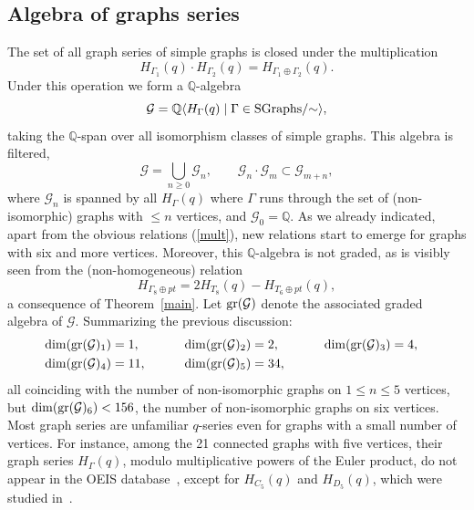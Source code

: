 \documentclass[pdftex]{sigma}
\numberwithin{equation}{section}
\theoremstyle{definition}
\begin{document}
\subsection{Algebra of graphs series}\label{section2.5}
The set of all graph series of simple graphs is closed under the multiplication
\begin{equation} \label{mult}
H_{\Gamma_1}(q) \cdot H_{\Gamma_2}(q)=H_{\Gamma_1 \oplus \Gamma_2}(q).
\end{equation}
Under this operation we form a $\mathbb{Q}$-algebra
\[
\mathcal{G}=\mathbb{Q} \langle H_{\Gamma}(q) \mid \Gamma \in {\rm SGraphs}/{\sim} \rangle,
\]
taking the $\mathbb{Q}$-span over all isomorphism classes of simple graphs.
This algebra is filtered,
\[
\mathcal{G}=\bigcup_{n \geq 0} \mathcal{G}_n, \qquad \mathcal{G}_n \cdot \mathcal{G}_m \subset \mathcal{G}_{m+n},
\]
where $\mathcal{G}_n$ is spanned by all $H_{\Gamma}(q)$ where $\Gamma$ runs through the set of (non-isomorphic)
graphs with $\leq n$ vertices, and $\mathcal{G}_0=\mathbb{Q}$.
As we already indicated, apart from the obvious relations (\ref{mult}), new relations start to emerge for graphs with six and more vertices.
Moreover, this $\mathbb{Q}$-algebra is not graded, as is visibly seen from the (non-homogeneous) relation
\[
H_{\Gamma_8 \oplus pt}=2 H_{T_8}(q)-H_{T_6 \oplus pt}(q),
\]
a consequence of Theorem~\ref{main}. Let ${\rm gr}(\mathcal{G})$ denote the associated graded algebra of $\mathcal{G}$.
Summarizing the previous discussion:
\begin{alignat*}{4}
& \dim ({\rm gr}(\mathcal{G})_1)=1, \qquad&& \dim ({\rm gr}(\mathcal{G})_2)=2, \qquad && \dim ({\rm gr}(\mathcal{G})_3)=4,&\\
& \dim ({\rm gr}(\mathcal{G})_4)=11,\qquad&& \dim ({\rm gr}(\mathcal{G})_5)=34, \qquad && &
\end{alignat*}
all coinciding with the number of non-isomorphic graphs on $1 \!\leq\! n\! \leq\! 5$ vertices, but $\dim ({\rm gr}(\mathcal{G})_6)<156$, the number of non-isomorphic graphs on six vertices.
Most graph series are unfamiliar $q$-series even for graphs with a small number of vertices.
For instance, among the 21 connected graphs with five vertices, their graph series $H_\Gamma(q)$, modulo multiplicative powers of the Euler product, do not appear in the OEIS database~\cite{OEIS}, except for $H_{C_5}(q)$ and $H_{D_5}(q)$, which were studied in~\cite{BJM}.
\end{document}
